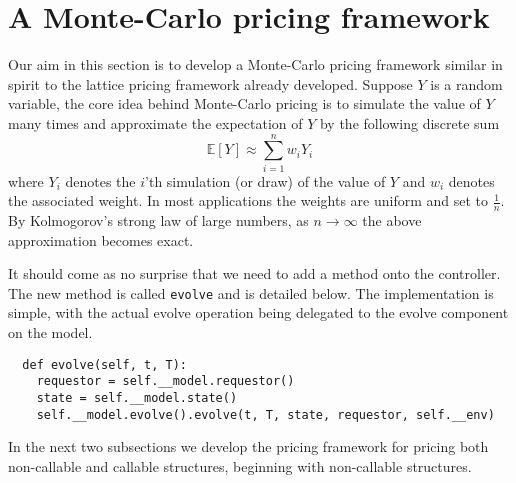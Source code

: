 \section{A Monte-Carlo pricing framework} \label{MonteCarlo} 
Our aim in this section is to develop a Monte-Carlo pricing framework
similar in spirit to the lattice pricing framework already
developed. Suppose $Y$ is a random variable, the core idea behind
Monte-Carlo pricing is to simulate the value of $Y$ many times and
approximate the expectation of $Y$ by the following discrete sum
\begin{equation}
\mathbb E[Y] \approx \sum_{i=1}^n w_i Y_i
\end{equation}
where $Y_i$ denotes the $i$'th simulation (or draw) of the value of
$Y$ and $w_i$ denotes the associated weight. In most applications the
weights are uniform and set to $\frac{1}{n}$.  By Kolmogorov's strong
law of large numbers, as $n \rightarrow \infty$ the above
approximation becomes exact.

It should come as no surprise that we need to add a method onto the
controller. The new method is called \verb|evolve| and is detailed
below.  The implementation is simple, with the actual evolve operation
being delegated to the evolve component on the model.
\begin{verbatim}
  def evolve(self, t, T):
    requestor = self.__model.requestor()
    state = self.__model.state()
    self.__model.evolve().evolve(t, T, state, requestor, self.__env)
\end{verbatim}

In the next two subsections we develop the pricing framework for
pricing both non-callable and callable structures, beginning with
non-callable structures.

